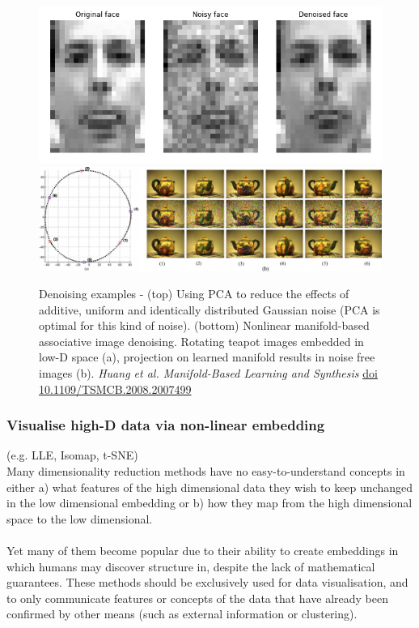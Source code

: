 \documentclass[11pt]{article}
\begin{document}
\begin{figure}[h!]
\centering
\includegraphics[width=0.75\linewidth]{pca_denoising_frey}
\\
\includegraphics[width=1.0\linewidth]{nonlinear_denoising_teapot_cropped}
\caption{Denoising examples - (top) Using PCA to reduce the effects of additive, uniform and identically distributed Gaussian noise (PCA is optimal for this kind of noise). (bottom) Nonlinear manifold-based associative image denoising. Rotating teapot images embedded in low-D space (a), projection on learned manifold results in noise free images (b). \emph{Huang et al. Manifold-Based Learning and Synthesis} \url{doi 10.1109/TSMCB.2008.2007499}}
\end{figure} 

\clearpage

 
\subsubsection{Visualise high-D data via non-linear embedding} 
(e.g. LLE, Isomap, t-SNE) \\ Many dimensionality reduction methods have no easy-to-understand concepts in either a) what features of the high dimensional data they wish to keep unchanged in the low dimensional embedding or b) how they map from the high dimensional space to the low dimensional. \\ \\ Yet many of them become popular due to their ability to create embeddings in which humans may discover structure in, despite the lack of mathematical guarantees. These methods should be exclusively used for data visualisation, and to only communicate features or concepts of the data that have already been confirmed by other means (such as external information or clustering).
 
\end{document}
